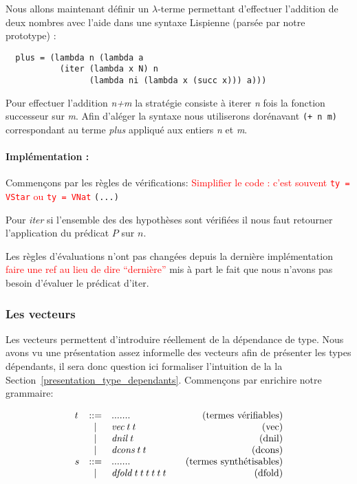 \documentclass {article}
\makeatletter
\newcommand{\codefrom}[3]
           {}
\theoremstyle{definition}
\theoremstyle{remark}
\newcommand{\todo}[1]{\textcolor{red}{#1}}
\newenvironment{bnf}
               {\[\begin{array}{lcl@{\qquad}r}}
               {\end{array}\]}
\makeatother
\begin{document}
Nous allons maintenant définir un $\lambda$-terme permettant d'effectuer l'addition de deux nombres avec l'aide dans une syntaxe
Lispienne (parsée par notre prototype) :
\begin{lstlisting}
  plus = (lambda n (lambda a 
           (iter (lambda x N) n 
                 (lambda ni (lambda x (succ x))) a)))
\end{lstlisting}
Pour effectuer l'addition \emph{n\:+\:m} la stratégie consiste à iterer \emph{n} fois la fonction successeur sur \emph{m}.
Afin d'aléger la syntaxe nous utiliserons dorénavant \lstinline!(+ n m)! correspondant au terme \emph{plus} appliqué aux entiers \emph{n} et
\emph{m}.

\paragraph{Implémentation :} 

Commençons par les règles de vérifications: \todo{Simplifier le code : c'est souvent \lstinline!ty = VStar! ou  \lstinline!ty = VNat!}
\codefrom{dependent}{lambda}{check_head}\lstinline!(...)!
\codefrom{dependent}{lambda}{check_nat}

Pour \emph{iter} si l'ensemble des des hypothèses sont vérifiées il nous faut retourner l'application
du prédicat $P$ sur $n$.
\codefrom{dependent}{lambda}{synth_iter}


Les règles d'évaluations n'ont pas changées depuis la dernière implémentation \todo{faire une ref au lieu de dire ``dernière''} mis à part le fait que  
nous n'avons pas besoin d'évaluer le prédicat d'iter.


\subsubsection{Les vecteurs}

Les vecteurs permettent d'introduire réellement de la dépendance de type. Nous avons vu une 
présentation assez informelle
des vecteurs afin de présenter les types dépendants, il sera donc question ici formaliser l'intuition de la
la Section~\ref{presentation_type_dependants}. 
Commençons par enrichire notre grammaire:

\newcommand{\vect}{\mathit{vec}} 
\newcommand{\dnil}{\mathit{dnil}}
\newcommand{\dcons}{\mathit{dcons}}
\newcommand{\dfold}{\mathit{dfold}}

\begin{bnf}
  t &::= &....... &\mbox{(termes vérifiables)} \\
  &|& \vect\:t\:t & \mbox{(vec)} \\
  &|& \dnil\:t & \mbox{(dnil)} \\
  &|& \dcons\:t\:t & \mbox{(dcons)} \\
  s &::= &....... &\mbox{(termes synthétisables)} \\
  &|& \dfold\:t\:t\:t\:t\:t\:t & \mbox{(dfold)}
\end{bnf}
\end{document}
